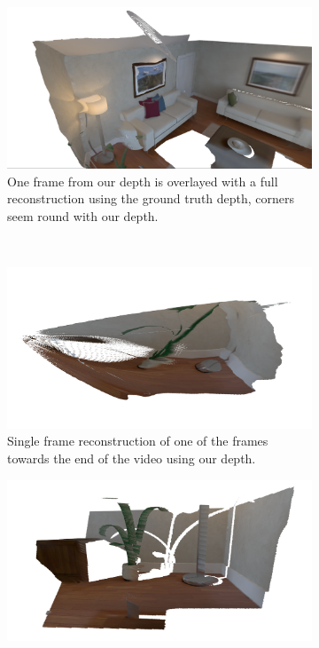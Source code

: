         \begin{figure}[ht!]
            \centering
            \begin{subfigure}[b]{.49\textwidth}
                \includegraphics[width=\textwidth]{images/depth_corner}
                \caption{One frame from our depth is overlayed with a full reconstruction using the ground truth depth, corners seem round with our depth.}
                \label{sfig:corner}
            \end{subfigure}\\
            \begin{subfigure}[b]{.49\textwidth}
                \includegraphics[width=\textwidth]{images/depth_ours}
                \caption{Single frame reconstruction of one of the frames towards the end of the video using our depth.}
                \label{sfig:depth_ours}
            \end{subfigure}
            \begin{subfigure}[b]{.49\textwidth}
                \includegraphics[width=\textwidth]{images/depth_truth}

\end{subfigure}
\end{figure}
